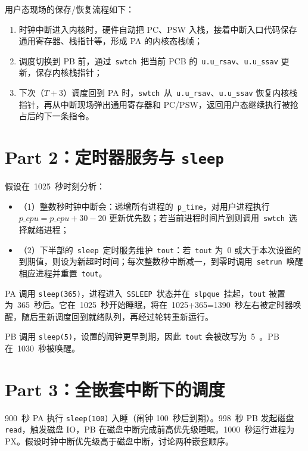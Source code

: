 \documentclass[11pt]{article}
\begin{document}
用户态现场的保存/恢复流程如下：
\begin{enumerate}
  \item 时钟中断进入内核时，硬件自动把 PC、PSW 入栈，接着中断入口代码保存通用寄存器、栈指针等，形成 PA 的内核态栈帧；
  \item 调度切换到 PB 前，通过~\verb|swtch|~把当前 PCB 的~\verb|u.u_rsav|、\verb|u.u_ssav| 更新，保存内核栈指针；
  \item 下次（$T{+}3$）调度回到 PA 时，\verb|swtch|~从~\verb|u.u_rsav|、\verb|u.u_ssav| 恢复内核栈指针，再从中断现场弹出通用寄存器和 PC/PSW，返回用户态继续执行被抢占后的下一条指令。
\end{enumerate}

\section*{Part 2：定时器服务与 \texttt{sleep}}
假设在~1025~秒时刻分析：
\begin{itemize}
  \item （1）整数秒时钟中断会：递增所有进程的~\verb|p_time|，对用户进程执行 $p\_cpu = p\_cpu + 30 - 20$ 更新优先数；若当前进程时间片到则调用~\verb|swtch|~选择就绪进程；
  \item （2）下半部的~\verb|sleep|~定时服务维护~\verb|tout|：若~\verb|tout| 为~0 或大于本次设置的到期值，则设为新超时时间；每次整数秒中断减一，到零时调用~\verb|setrun|~唤醒相应进程并重置~\verb|tout|。
\end{itemize}

PA 调用 \verb|sleep(365)|，进程进入~\verb|SSLEEP|~状态并在~\verb|slpque|~挂起，\verb|tout| 被置为~365~秒后。它在~1025~秒开始睡眠，将在~1025+365=1390~秒左右被定时器唤醒，随后重新调度回到就绪队列，再经过轮转重新运行。

PB 调用 \verb|sleep(5)|，设置的闹钟更早到期，因此~\verb|tout| 会被改写为~5~。PB 在~1030~秒被唤醒。

\section*{Part 3：全嵌套中断下的调度}
900~秒 PA 执行 \verb|sleep(100)| 入睡（闹钟 100~秒后到期）。998~秒 PB 发起磁盘 \verb|read|，触发磁盘 IO，PB 在磁盘中断完成前高优先级睡眠。1000~秒运行进程为 PX。假设时钟中断优先级高于磁盘中断，讨论两种嵌套顺序。
\end{document}
